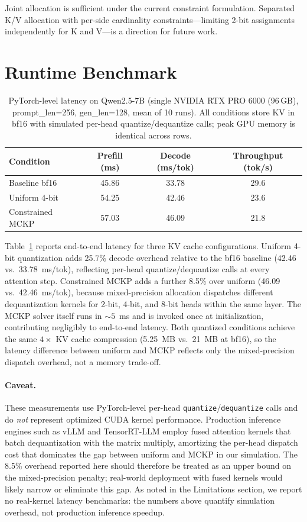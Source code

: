 Joint allocation is sufficient under the current constraint formulation.
Separated K/V allocation with per-side cardinality constraints---limiting 2-bit assignments independently for K and V---is a direction for future work.

\section{Runtime Benchmark}
\label{sec:runtime}

\begin{table}[ht]
\centering
\caption{PyTorch-level latency on Qwen2.5-7B (single NVIDIA RTX PRO 6000 (96\,GB), prompt\_len=256, gen\_len=128, mean of 10 runs). All conditions store KV in bf16 with simulated per-head quantize/dequantize calls; peak GPU memory is identical across rows.}
\label{tab:runtime}
\begin{tabular}{lccc}
\toprule
Condition & Prefill (ms) & Decode (ms/tok) & Throughput (tok/s) \\
\midrule
Baseline bf16       & 45.86 & 33.78 & 29.6 \\
Uniform 4-bit       & 54.25 & 42.46 & 23.6 \\
Constrained MCKP    & 57.03 & 46.09 & 21.8 \\
\bottomrule
\end{tabular}
\end{table}

Table~\ref{tab:runtime} reports end-to-end latency for three KV cache configurations.
Uniform 4-bit quantization adds 25.7\% decode overhead relative to the bf16 baseline (42.46 vs.\ 33.78~ms/tok), reflecting per-head quantize/dequantize calls at every attention step.
Constrained MCKP adds a further 8.5\% over uniform (46.09 vs.\ 42.46~ms/tok), because mixed-precision allocation dispatches different dequantization kernels for 2-bit, 4-bit, and 8-bit heads within the same layer.
The MCKP solver itself runs in ${\sim}5$~ms and is invoked once at initialization, contributing negligibly to end-to-end latency.
Both quantized conditions achieve the same $4\times$ KV cache compression (5.25~MB vs.\ 21~MB at bf16), so the latency difference between uniform and MCKP reflects only the mixed-precision dispatch overhead, not a memory trade-off.

\paragraph{Caveat.}
These measurements use PyTorch-level per-head \texttt{quantize}/\texttt{dequantize} calls and do \emph{not} represent optimized CUDA kernel performance.
Production inference engines such as vLLM and TensorRT-LLM employ fused attention kernels that batch dequantization with the matrix multiply, amortizing the per-head dispatch cost that dominates the gap between uniform and MCKP in our simulation.
The 8.5\% overhead reported here should therefore be treated as an upper bound on the mixed-precision penalty; real-world deployment with fused kernels would likely narrow or eliminate this gap.
As noted in the Limitations section, we report no real-kernel latency benchmarks: the numbers above quantify simulation overhead, not production inference speedup.

